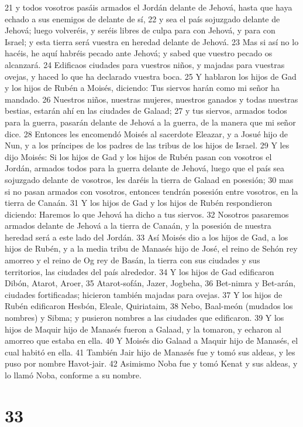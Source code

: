 21 y todos vosotros pasáis armados el Jordán delante de Jehová, hasta que haya echado a sus enemigos de delante de sí,
22 y sea el país sojuzgado delante de Jehová; luego volveréis, y seréis libres de culpa para con Jehová, y para con Israel; y esta tierra será vuestra en heredad delante de Jehová.
23 Mas si así no lo hacéis, he aquí habréis pecado ante Jehová; y sabed que vuestro pecado os alcanzará.
24 Edificaos ciudades para vuestros niños, y majadas para vuestras ovejas, y haced lo que ha declarado vuestra boca.
25 Y hablaron los hijos de Gad y los hijos de Rubén a Moisés, diciendo: Tus siervos harán como mi señor ha mandado.
26 Nuestros niños, nuestras mujeres, nuestros ganados y todas nuestras bestias, estarán ahí en las ciudades de Galaad;
27 y tus siervos, armados todos para la guerra, pasarán delante de Jehová a la guerra, de la manera que mi señor dice.
28 Entonces les encomendó Moisés al sacerdote Eleazar, y a Josué hijo de Nun, y a los príncipes de los padres de las tribus de los hijos de Israel.
29 Y les dijo Moisés: Si los hijos de Gad y los hijos de Rubén pasan con vosotros el Jordán, armados todos para la guerra delante de Jehová, luego que el país sea sojuzgado delante de vosotros, les daréis la tierra de Galaad en posesión;
30 mas si no pasan armados con vosotros, entonces tendrán posesión entre vosotros, en la tierra de Canaán.
31 Y los hijos de Gad y los hijos de Rubén respondieron diciendo: Haremos lo que Jehová ha dicho a tus siervos.
32 Nosotros pasaremos armados delante de Jehová a la tierra de Canaán, y la posesión de nuestra heredad será a este lado del Jordán.
33 Así Moisés dio a los hijos de Gad, a los hijos de Rubén, y a la media tribu de Manasés hijo de José, el reino de Sehón rey amorreo y el reino de Og rey de Basán, la tierra con sus ciudades y sus territorios, las ciudades del país alrededor. 
34 Y los hijos de Gad edificaron Dibón, Atarot, Aroer,
35 Atarot-sofán, Jazer, Jogbeha,
36 Bet-nimra y Bet-arán, ciudades fortificadas; hicieron también majadas para ovejas.
37 Y los hijos de Rubén edificaron Hesbón, Eleale, Quiriataim,
38 Nebo, Baal-meón (mudados los nombres) y Sibma; y pusieron nombres a las ciudades que edificaron.
39 Y los hijos de Maquir hijo de Manasés fueron a Galaad, y la tomaron, y echaron al amorreo que estaba en ella.
40 Y Moisés dio Galaad a Maquir hijo de Manasés, el cual habitó en ella.
41 También Jair hijo de Manasés fue y tomó sus aldeas, y les puso por nombre Havot-jair.
42 Asimismo Noba fue y tomó Kenat y sus aldeas, y lo llamó Noba, conforme a su nombre.

\chapter{33}

